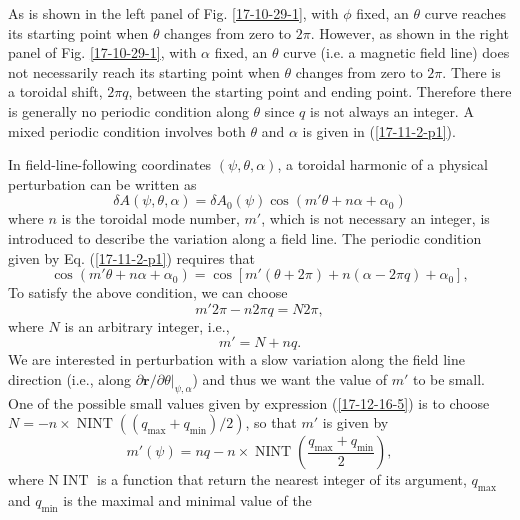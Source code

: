 \documentclass{llncs}
\newcommand{\nobracket}{}
\newcommand{\tmop}[1]{\ensuremath{\operatorname{#1}}}
\begin{document}
As is shown in the left panel of Fig. \ref{17-10-29-1}, with $\phi$ fixed, an
$\theta$ curve reaches its starting point when $\theta$ changes from zero to
$2 \pi$. However, as shown in the right panel of Fig. \ref{17-10-29-1}, with
$\alpha$ fixed, an $\theta$ curve (i.e. a magnetic field line) does not
necessarily reach its starting point when $\theta$ changes from zero to $2
\pi$. There is a toroidal shift, $2 \pi q$, between the starting point and
ending point. Therefore there is generally no periodic condition along
$\theta$ since $q$ is not always an integer. A mixed periodic condition
involves both $\theta$ and $\alpha$ is given in (\ref{17-11-2-p1}).

In field-line-following coordinates $(\psi, \theta, \alpha)$, a toroidal
harmonic of a physical perturbation can be written as
\begin{equation}
  \label{17-10-30-e1} \delta A (\psi, \theta, \alpha) = \delta A_0 (\psi) \cos
  (m' \theta + n \alpha + \alpha_0)
\end{equation}
where $n$ is the toroidal mode number, $m'$, which is not necessary an
integer, is introduced to describe the variation along a field line. The
periodic condition given by Eq. (\ref{17-11-2-p1}) requires that
\begin{equation}
  \cos (m' \theta + n \alpha + \alpha_0) = \cos [m' (\theta + 2 \pi) + n
  (\alpha - 2 \pi q) + \alpha_0],
\end{equation}
To satisfy the above condition, we can choose
\begin{equation}
  m' 2 \pi - n 2 \pi q = N 2 \pi,
\end{equation}
where $N$ is an arbitrary integer, i.e.,
\begin{equation}
  \label{17-12-16-5} m' = N + n q.
\end{equation}
We are interested in perturbation with a slow variation along the field line
direction (i.e., along $\partial \mathbf{r}/ \partial \theta |_{\psi, \alpha}
\nobracket$) and thus we want the value of $m'$ to be small. One of the
possible small values given by expression (\ref{17-12-16-5}) is to choose $N =
- n \times \tmop{NINT} ((q_{\max} + q_{\min}) / 2)$, so that $m'$ is given by
\begin{equation}
  \label{18-5-4-p1} m' (\psi) = n q - n \times \tmop{NINT} \left(
  \frac{q_{\max} + q_{\min}}{2} \right),
\end{equation}
where N$\tmop{INT}$ is a function that return the nearest integer of its
argument, $q_{\max}$ and $q_{\min}$ is the maximal and minimal value of the
\end{document}
